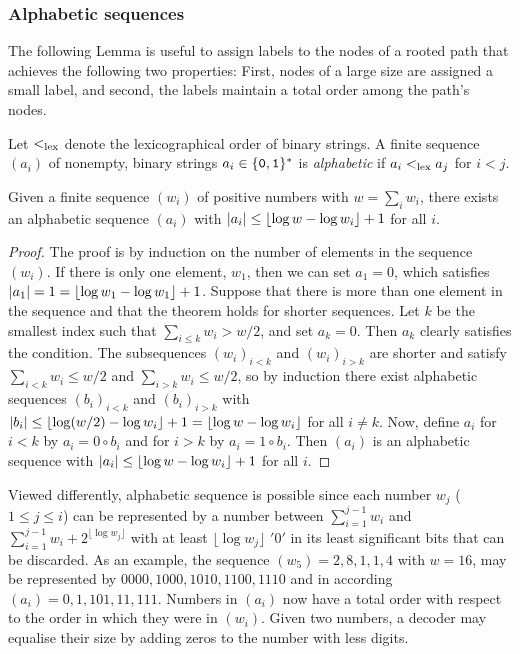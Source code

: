 \subsubsection{Alphabetic sequences}\label{tec:alphabetic}
The following Lemma is useful to assign labels to the nodes of a rooted path that achieves the following two properties:
First, nodes of  a large size are assigned a small label, and  second, the labels maintain a total order among the path's nodes.

Let $\lex$ denote the lexicographical order of binary strings. A finite sequence $(a_i)$ of nonempty, binary strings $a_i\in\{\mathtt{0},\mathtt{1}\}^*$ is \emph{alphabetic} if $a_i \lex a_j$ for $i<j$. 


\begin{lemma}\label{lemma:Gilbert}
Given a finite sequence $(w_i)$ of positive numbers with $w=\sum_iw_i$, there exists an alphabetic sequence $(a_i)$ with $|a_i|\leq \left\lfloor{\log w - \log w_i}\right\rfloor+1$ for all $i$.
\end{lemma}	
\begin{proof}
The proof is by induction on the number of elements in the sequence $(w_i)$. If there is only one element, $w_1$, then we can set $a_1=0$, which satisfies $|a_1|=1 =\left\lfloor{\log w_1-\log w_1}\right\rfloor+1$.  Suppose that there is more than one element in the sequence and that the theorem holds for shorter sequences. Let $k$ be the smallest index such that $\sum_{i\leq k} w_i>w/2$, and set $a_k=0$.  Then $a_k$ clearly satisfies the condition. The subsequences $(w_i)_{i<k}$ and $(w_i)_{i>k}$ are shorter and satisfy $\sum_{i<k}w_i\leq w/2$ and $\sum_{i>k}w_i\leq w/2$, so by induction there exist alphabetic sequences $(b_i)_{i<k}$ and $(b_i)_{i>k}$ with $|b_i|\leq \left\lfloor{\log(w/2)-\log w_i}\right\rfloor +1 = \left\lfloor{\log w-\log w_i}\right\rfloor $ for all $i\neq k$. Now, define $a_i$ for $i<k$ by $a_i=0\circ b_i$ and for $i>k$ by $a_i=1\circ b_i$. Then $(a_i)$ is an alphabetic sequence with $|a_i|\leq\left\lfloor{\log w-\log w_i}\right\rfloor+1$ for all $i$.
\end{proof}

Viewed differently,  alphabetic sequence is possible since each number $w_j$  ($1 \leq j \leq i$) can be represented by a number between  $\sum_{i=1}^{j-1}w_i$ and  $ \sum_{i=1}^{j-1}w_i +2^{\lfloor \log w_j \rfloor}$  with at least $\lfloor \log w_j \rfloor$ $'0'$ in its least significant bits that can be discarded.
As an example, the sequence $(w_5)=2,8,1,1,4$ with $w=16$,    may be represented by $0000,1000,1010,1100,1110$ and in according $(a_i) = 0,1,101,11,111$.
Numbers in $(a_i)$ now have a total order with respect to the order in which they were in $(w_i)$. Given two numbers, a decoder may equalise their size by adding zeros to the number with less digits. 



